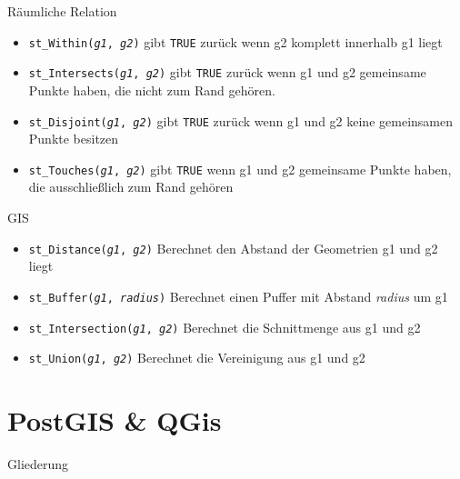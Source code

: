 \documentclass[18pt]{beamer}
\newcommand{\sql}[1]{%
\texttt{\color{sql}#1}
}
\begin{document}
\begin{frame}{Räumliche Relation}
\begin{itemize}
\item \texttt{st\_Within(\textit{g1}, \textit{g2})} gibt \sql{TRUE} zurück wenn g2 komplett innerhalb g1 liegt
\item \texttt{st\_Intersects(\textit{g1}, \textit{g2})} gibt \sql{TRUE} zurück wenn g1 und g2 gemeinsame Punkte haben, die nicht zum Rand gehören.
\item \texttt{st\_Disjoint(\textit{g1}, \textit{g2})} gibt \sql{TRUE} zurück wenn g1 und g2 keine gemeinsamen Punkte besitzen
\item \texttt{st\_Touches(\textit{g1}, \textit{g2})} gibt \sql{TRUE} wenn g1 und g2 gemeinsame Punkte haben, die ausschließlich zum Rand gehören
\end{itemize}
\end{frame}

\begin{frame}{GIS}
\begin{itemize}
\item \texttt{st\_Distance(\textit{g1}, \textit{g2})} Berechnet den Abstand der Geometrien g1 und g2
liegt
\item \texttt{st\_Buffer(\textit{g1}, \textit{radius})} Berechnet einen Puffer mit Abstand \textit{radius} um g1
\item \texttt{st\_Intersection(\textit{g1}, \textit{g2})} Berechnet die Schnittmenge aus g1 und g2
\item \texttt{st\_Union(\textit{g1}, \textit{g2})} Berechnet die Vereinigung aus g1 und g2
\end{itemize}
\end{frame}


\section{PostGIS \& QGis}

\begin{frame}{Gliederung}
\tableofcontents[currentsection]
\end{frame}



\end{document}
